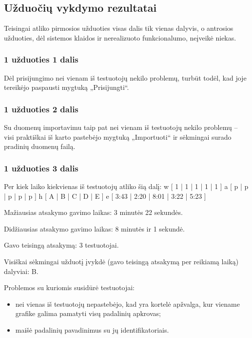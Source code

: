 \subsection{Užduočių vykdymo rezultatai}

Teisingai atliko pirmosios užduoties visas dalis tik vienas dalyvis,
o antrosios užduoties, dėl sistemos klaidos ir nerealizuoto
funkcionalumo, neįveikė niekas.

\subsubsection{1 užduoties 1 dalis}

Dėl prisijungimo nei vienam iš testuotojų nekilo problemų, turbūt todėl,
kad joje tereikėjo paspausti mygtuką „Prisijungti“.

\subsubsection{1 užduoties 2 dalis}

Su duomenų importavimu taip pat nei vienam iš testuotojų nekilo problemų
– visi praktiškai iš karto pastebėjo mygtuką „Importuoti“ ir sėkmingai
surado pradinių duomenų failą.

\subsubsection{1 užduoties 3 dalis}

Per kiek laiko kiekvienas iš testuotojų atliko šią dalį:
\xtable
{
  w [ 1 | 1 | 1 | 1 | 1 ]
  a [ p | p | p | p | p ]
  h [ A | B | C | D | E ]
  e [ 3:43 | 2:20 | 8:01 | 3:22 | 5:23 ]
}

Mažiausias atsakymo gavimo laikas: 3 minutės 22 sekundės.

Didžiausias atsakymo gavimo laikas: 8 minutės ir 1 sekundė.

Gavo teisingą atsakymą: 3 testuotojai.

Visiškai sėkmingai užduotį įvykdė (gavo teisingą atsakymą per reikiamą 
laiką) dalyviai: B.

Problemos su kuriomis susidūrė testuotojai:
\begin{itemize}
  \item nei vienas iš testuotojų nepastebėjo, kad yra kortelė apžvalga,
    kur viename grafike galima pamatyti visų padalinių apkrovas;
  \item maišė padalinių pavadinimus su jų identifikatoriais.
\end{itemize}

